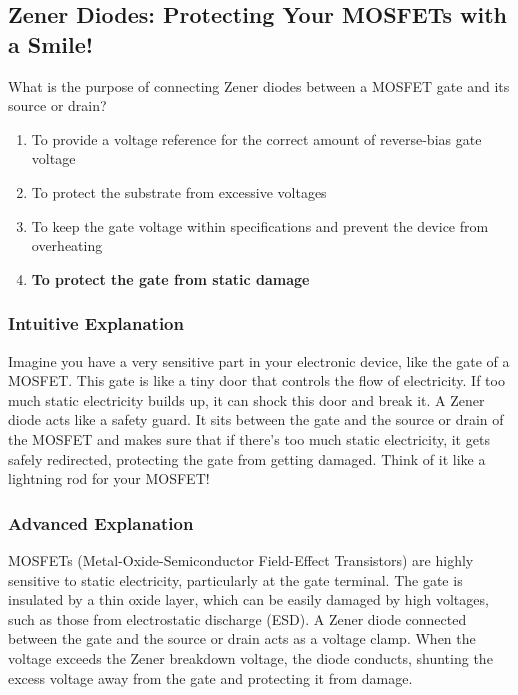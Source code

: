 \subsection{Zener Diodes: Protecting Your MOSFETs with a Smile!}

\begin{tcolorbox}[colback=gray!10!white,colframe=black!75!black,title=E6A12] What is the purpose of connecting Zener diodes between a MOSFET gate and its source or drain?
    \begin{enumerate}[label=\Alph*.]
        \item To provide a voltage reference for the correct amount of reverse-bias gate voltage
        \item To protect the substrate from excessive voltages
        \item To keep the gate voltage within specifications and prevent the device from overheating
        \item \textbf{To protect the gate from static damage}
    \end{enumerate}
\end{tcolorbox}

\subsubsection{Intuitive Explanation}
Imagine you have a very sensitive part in your electronic device, like the gate of a MOSFET. This gate is like a tiny door that controls the flow of electricity. If too much static electricity builds up, it can shock this door and break it. A Zener diode acts like a safety guard. It sits between the gate and the source or drain of the MOSFET and makes sure that if there’s too much static electricity, it gets safely redirected, protecting the gate from getting damaged. Think of it like a lightning rod for your MOSFET!

\subsubsection{Advanced Explanation}
MOSFETs (Metal-Oxide-Semiconductor Field-Effect Transistors) are highly sensitive to static electricity, particularly at the gate terminal. The gate is insulated by a thin oxide layer, which can be easily damaged by high voltages, such as those from electrostatic discharge (ESD). A Zener diode connected between the gate and the source or drain acts as a voltage clamp. When the voltage exceeds the Zener breakdown voltage, the diode conducts, shunting the excess voltage away from the gate and protecting it from damage.

